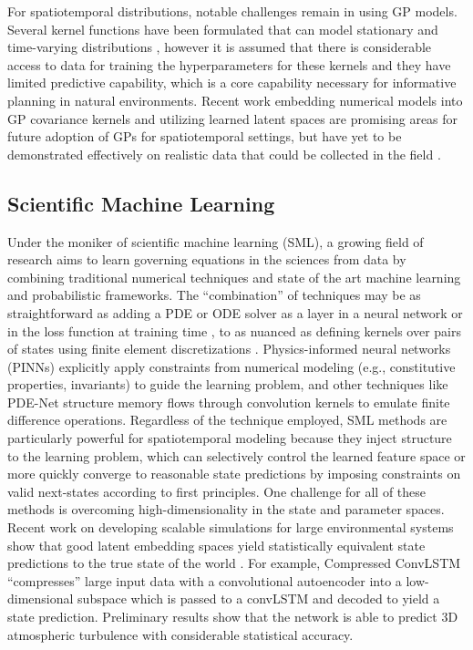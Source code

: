 For spatiotemporal distributions, notable challenges remain in using GP models. Several kernel functions have been formulated that can model stationary and time-varying distributions \autocite{singh2010modeling, garg2012learning, chen2022ak, raissi2018numerical}, however it is assumed that there is considerable access to data for training the hyperparameters for these kernels and they have limited predictive capability, which is a core capability necessary for informative planning in natural environments. Recent work embedding numerical models into GP covariance kernels \autocite{raissi2018numerical} and utilizing learned latent spaces \autocite{wilson2016deep,al2017learning,wilson2016stochastic,sun2018differentiable,wang2022physics,wan2017reduced,you2017deep,whitman2017learning,kingravi2016kernel} are promising areas for future adoption of GPs for spatiotemporal settings, but have yet to be demonstrated effectively on realistic data that could be collected in the field \autocite{ober2021promises}.


\subsection{Scientific Machine Learning}
Under the moniker of scientific machine learning (SML), a growing field of research aims to learn governing equations in the sciences from data by combining traditional numerical techniques and state of the art machine learning and probabilistic frameworks. The ``combination'' of techniques may be as straightforward as adding a PDE or ODE solver as a layer in a neural network \autocite{pakravan2021solving} or in the loss function at training time \autocite{raissi2019physics}, to as nuanced as defining kernels over pairs of states using finite element discretizations \autocite{raissi2018numerical}. Physics-informed neural networks (PINNs) \autocite{raissi2019physics,tartakovsky2018learning} explicitly apply constraints from numerical modeling (e.g., constitutive properties, invariants) to guide the learning problem, and other techniques like PDE-Net \autocite{long2017pde} structure memory flows through convolution kernels to emulate finite difference operations. Regardless of the technique employed, SML methods are particularly powerful for spatiotemporal modeling because they inject structure to the learning problem, which can selectively control the learned feature space or more quickly converge to reasonable state predictions by imposing constraints on valid next-states according to first principles. One challenge for all of these methods is overcoming high-dimensionality in the state and parameter spaces.
Recent work on developing scalable simulations for large environmental systems show that good latent embedding spaces yield statistically equivalent state predictions to the true state of the world \autocite{qian2020lift,mardt2020deep,baddoo2022kernel,baddoo2021physics}. For example, Compressed ConvLSTM \autocite{mohan2019compressed} ``compresses'' large input data with a convolutional autoencoder into a low-dimensional subspace which is passed to a convLSTM and decoded to yield a state prediction. Preliminary results show that the network is able to predict 3D atmospheric turbulence with considerable statistical accuracy. 

